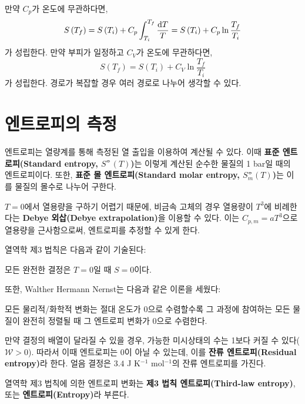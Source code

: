         만약 $C_p$가 온도에 무관하다면, 
        \begin{equation*}
            S\left(T_f\right)=S\left(T_i\right) + C_p\int_{T_i}^{T_f}\frac{\operatorname{d\!} T}{T} = S\left(T_i\right)+C_p \ln{\frac{T_f}{T_i}}
        \end{equation*}
        가 성립한다. 만약 부피가 일정하고 $C_V$가 온도에 무관하다면, 
        \begin{equation*}
            S\left(T_f\right) = S\left(T_i\right) + C_V \ln{\frac{T_f}{T_i}}
        \end{equation*}
        가 성립한다. 경로가 복잡할 경우 여러 경로로 나누어 생각할 수 있다.
    \section{엔트로피의 측정}
        \hspace{\parindent} 엔트로피는 열량계를 통해 측정된 열 출입을 이용하여 계산될 수 있다. 이때 \textbf{표준 엔트로피(Standard entropy, $S^\circlehbar\left(T\right)$)}는 
        이렇게 계산된 순수한 물질의 1 bar일 때의 엔트로피이다. 
        또한, \textbf{표준 몰 엔트로피(Standard molar entropy, $S_{m}^{\circlehbar}\left(T\right)$)}는 이를 물질의 몰수로 나누어 구한다. 
        \par $T=0$에서 열용량을 구하기 어렵기 때문에, 비금속 고체의 경우 열용량이 $T^3$에 비례한다는 \textbf{Debye 외삽(Debye extrapolation)}을 이용할 수 있다. 이는 
        $C_{p,m} = aT^3$으로 열용량을 근사함으로써, 엔트로피를 추정할 수 있게 한다.
        \par 열역학 제3 법칙은 다음과 같이 기술된다:
        \begin{law}[열역학 제3 법칙]
            모든 완전한 결정은 $T=0$일 때 $S=0$이다. 
        \end{law}
        또한, Walther Hermann Nernst는 다음과 같은 이론을 세웠다:
        \begin{thm}
            모든 물리적/화학적 변화는 절대 온도가 0으로 수렴할수록 그 과정에 참여하는 모든 물질이 완전히 정렬될 때 그 엔트로피 변화가 0으로 수렴한다.
        \end{thm}
        \par 만약 결정의 배열이 달라질 수 있을 경우, 가능한 미시상태의 수는 1보다 커질 수 있다($\displaystyle\mathcal{W}>0$). 따라서 이때 엔트로피는 0이 아닐 수 있는데, 이를 \textbf{잔류 엔트로피(Residual entropy)}라 한다. 
        얼음 결정은 $3.4$ J K$^{-1}$ mol$^{-1}$의 잔류 엔트로피를 가진다.
        \par 열역학 제3 법칙에 의한 엔트로피 변화는 \textbf{제3 법칙 엔트로피(Third-law entropy)}, 또는 \textbf{엔트로피(Entropy)}라 부른다. 
